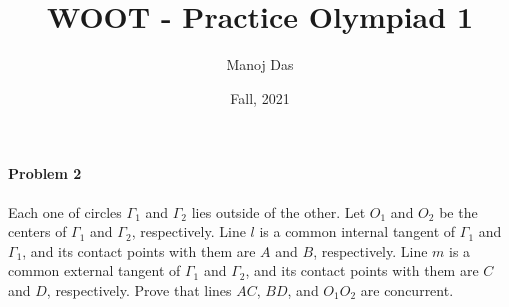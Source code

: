 \documentclass[11pt,twoside]{scrartcl}
\begin{document}
\title{WOOT - Practice Olympiad 1}

\author{Manoj Das}
\date{Fall, 2021}
\paragraph{Problem 2}
Each one of circles $\Gamma_1$ and $\Gamma_2$ lies outside of the other. Let $O_1$ and $O_2$ be the centers of $\Gamma_1$ and $\Gamma_2$,
respectively. Line $l$ is a common internal tangent of $\Gamma_1$ and $\Gamma_1$, and its contact points with them are $A$ and $B$,
respectively. Line $m$ is a common external tangent of $\Gamma_1$ and $\Gamma_2$, and its contact points with them are $C$ and
$D$, respectively. Prove that lines $AC$, $BD$, and $O_1O_2$ are concurrent.
\end{document}
